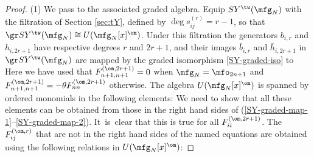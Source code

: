 \documentclass{amsart}
\numberwithin{equation}{section}
\theoremstyle{remark}
\renewcommand{\,}{\kern 0.1em} %
\begin{document}
\begin{proof}
%
(1) We pass to the associated graded algebra. Equip $SY^{\tw}(\mfg_N)$ with the filtration of Section \ref{sec:tY}, defined by $\deg s^{(r)}_{ij}=r-1$, so that $\gr SY^{\tw}(\mfg_N)\cong U(\mfg_N[x]^\om)$. Under this filtration the generators $b_{i,r}$ and $h_{i,2r+1}$ have respective degrees $r$ and $2r+1$, and their images $\bar b_{i,r}$ and $\bar h_{i,2r+1}$ in $\gr SY^{\tw}(\mfg_N)$ are mapped by the graded isomorphism \eqref{SY-graded-iso} to
%
%
Here we have used that $F^{(\om,2r+1)}_{n+1,n+1}=0$ when $\mfg_N = \mfo_{2n+1}$ and $F^{(\om,2r+1)}_{n+1,n+1}=-\theta F^{(\om,2r+1)}_{nn}$ otherwise. The algebra $U(\mfg_N[x]^\om)$ is spanned by ordered monomials in the following elements:
%
%
We need to show that all these elements can be obtained from those in the right hand sides of (\ref{SY-graded-map-1}--\ref{SY-graded-map-2}). 
It~is~clear that this is true for all $F_{ii}^{(\om,2r+1)}$. The $F^{(\om,r)}_{ij}$ that are not in the right hand sides of the named equations are obtained using the following relations in $U(\mfg_N[x]^\om)$:
%
\end{proof}
\end{document}
